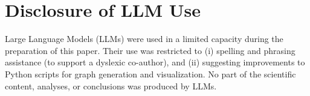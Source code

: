 \documentclass[runningheads, orivec]{llncs}
\begin{document}
\section{Disclosure of LLM Use}
Large Language Models (LLMs) were used in a limited capacity during the preparation of this paper. Their use was restricted to (i) spelling and phrasing assistance (to support a dyslexic co-author), and (ii) suggesting improvements to Python scripts for graph generation and visualization. No part of the scientific content, analyses, or conclusions was produced by LLMs.
\end{document}
